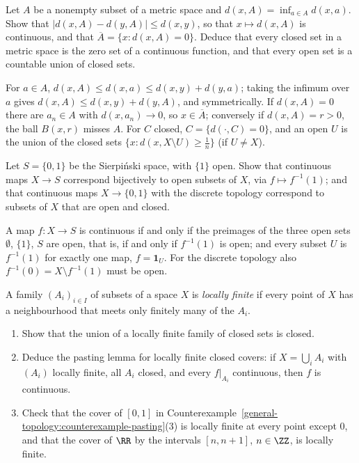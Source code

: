 \begin{exercise}\label{general-topology:exercise-distance-set}
Let $A$ be a nonempty subset of a metric space and $d(x, A) = \inf_{a \in A}d(x, a)$. Show that $|d(x, A) - d(y, A)| \leq d(x, y)$, so that $x \mapsto d(x, A)$ is continuous, and that
$\overline{A} = \{x : d(x, A) = 0\}$. Deduce that every closed set in a metric space is the zero set of a continuous function, and that every open set is a countable union of closed sets.
\end{exercise}

\begin{solution}
For $a \in A$, $d(x, A) \leq d(x, a) \leq d(x, y) + d(y, a)$; taking the infimum over $a$ gives $d(x, A) \leq d(x, y) + d(y, A)$, and symmetrically. If $d(x, A) = 0$ there are $a_n \in A$ with
$d(x, a_n) \to 0$, so $x \in \overline{A}$; conversely if $d(x, A) = r > 0$, the ball $B(x, r)$ misses $A$. For $C$ closed, $C = \{d(\cdot, C) = 0\}$, and an open $U$ is the union of the closed sets
$\{x : d(x, X \setminus U) \geq \frac1n\}$ (if $U \neq X$).
\end{solution}

\begin{exercise}\label{general-topology:exercise-two-point-continuous}
Let $S = \{0, 1\}$ be the Sierpi\'nski space, with $\{1\}$ open. Show that continuous maps $X \to S$ correspond bijectively to open subsets of $X$, via $f \mapsto f^{-1}(1)$; and that continuous maps
$X \to \{0, 1\}$ with the discrete topology correspond to subsets of $X$ that are open and closed.
\end{exercise}

\begin{solution}
A map $f \colon X \to S$ is continuous if and only if the preimages of the three open sets $\emptyset$, $\{1\}$, $S$ are open, that is, if and only if $f^{-1}(1)$ is open; and every subset $U$ is
$f^{-1}(1)$ for exactly one map, $f = \mathbf{1}_U$. For the discrete topology also $f^{-1}(0) = X \setminus f^{-1}(1)$ must be open.
\end{solution}

\begin{exercise}\label{general-topology:exercise-pasting-locally-finite}
A family $(A_i)_{i \in I}$ of subsets of a space $X$ is \emph{locally finite} if every point of $X$ has a neighbourhood that meets only finitely many of the $A_i$.
\begin{enumerate}
\item Show that the union of a locally finite family of closed sets is closed.
\item Deduce the pasting lemma for locally finite closed covers: if $X = \bigcup_iA_i$ with $(A_i)$ locally finite, all $A_i$ closed, and every $f|_{A_i}$ continuous, then $f$ is continuous.
\item Check that the cover of $[0, 1]$ in Counterexample~\ref{general-topology:counterexample-pasting}(3) is locally finite at every point except $0$, and that the cover of $\RR$ by the intervals $[n, n+1]$, $n \in \ZZ$, is locally finite.
\end{enumerate}
\end{exercise}

